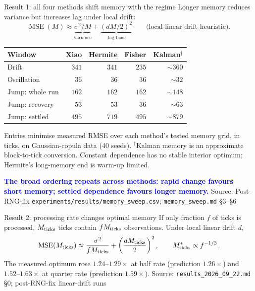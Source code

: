 \documentclass[aspectratio=169,11pt]{beamer}
\newcommand{\good}[1]{\textcolor{blue}{\textbf{#1}}}
\newcommand{\src}[1]{\vfill{\tiny\color{gray}Source: #1}}
\begin{document}
\begin{frame}{Result 1: all four methods shift memory with the regime}
  \small Longer memory reduces variance but increases lag under local drift:
  \[
    \operatorname{MSE}(M)\approx
      \underbrace{\sigma^2/M}_{\text{variance}}
      +\underbrace{(dM/2)^2}_{\text{lag bias}}
    \qquad\text{(local-linear-drift heuristic).}
  \]
  \begin{center}
  \begin{tabular}{lrrrr}
    \toprule
    Window & Xiao & Hermite & Fisher & Kalman$^\dagger$\\
    \midrule
    Drift            & $341$ & $341$ & $235$ & $\sim360$\\
    Oscillation      & $36$  & $36$  & $36$  & $\sim32$\\
    Jump: whole run  & $162$ & $162$ & $162$ & $\sim148$\\
    Jump: recovery   & $53$  & $53$  & $36$  & $\sim63$\\
    Jump: settled    & $495$ & $719$ & $495$ & $\sim879$\\
    \bottomrule
  \end{tabular}
  \end{center}
  \scriptsize Entries minimise measured RMSE over each method's tested memory grid,
  in ticks, on Gaussian-copula data (40 seeds). $^\dagger$Kalman memory is an
  approximate block-to-tick conversion. Constant dependence has no stable
  interior optimum; Hermite's long-memory end is warm-up limited.
  \par\smallskip
  \small\good{The broad ordering repeats across methods: rapid change favours short
  memory; settled dependence favours longer memory.}
  \src{Post-RNG-fix \texttt{experiments/results/memory\_sweep.csv}; \texttt{memory\_sweep.md} \S3--\S6}
\end{frame}

\begin{frame}{Result 2: processing rate changes optimal memory}
  If only fraction $f$ of ticks is processed, $M_{\rm ticks}$ ticks contain
  $fM_{\rm ticks}$ observations. Under local linear drift $d$,
  \[
    \operatorname{MSE}(M_{\rm ticks})
      \approx\frac{\sigma^2}{fM_{\rm ticks}}
       +\left(\frac{dM_{\rm ticks}}{2}\right)^2,
    \qquad M_{\rm ticks}^*\propto f^{-1/3}.
  \]
  The measured optimum rose $1.24$--$1.29\times$ at half rate (prediction
  $1.26\times$) and $1.52$--$1.63\times$ at quarter rate (prediction $1.59\times$).
  \src{\texttt{results\_2026\_09\_22.md} \S0; post-RNG-fix linear-drift runs}
\end{frame}
\end{document}

